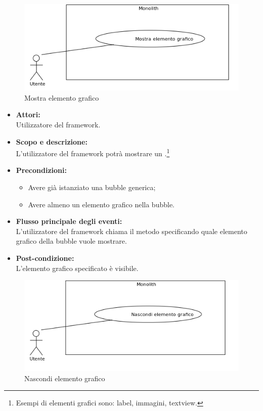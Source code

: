 
\begin{figure}[H]
	\centering
	\includegraphics[width=15cm]{../../documenti/AnalisiDeiRequisiti/Diagrammi_img/uc1_21.png}
	\caption{\UCCaption{} Mostra elemento grafico}
\end{figure}

\begin{itemize}
	\item \textbf{Attori:}
	\\Utilizzatore del framework.
	\item \textbf{Scopo e descrizione:} 
	\\L'utilizzatore del framework potrà mostrare un .\footnote{Esempi di elementi grafici sono: label, immagini, textview.}
	\item \textbf{Precondizioni:}
	\begin{itemize}
		\item Avere già istanziato una bubble generica;
		\item Avere almeno un elemento grafico nella bubble.
	\end{itemize}
	\item \textbf{Flusso principale degli eventi:}
	\\L'utilizzatore del framework chiama il metodo specificando quale elemento grafico della bubble vuole mostrare.
	\item \textbf{Post-condizione:}
	\\L'elemento grafico specificato è visibile.
\end{itemize}


\begin{figure}[H]
	\centering
	\includegraphics[width=15cm]{../../documenti/AnalisiDeiRequisiti/Diagrammi_img/uc1_22.png}
	\caption{\UCCaption{} Nascondi elemento grafico}
\end{figure}

